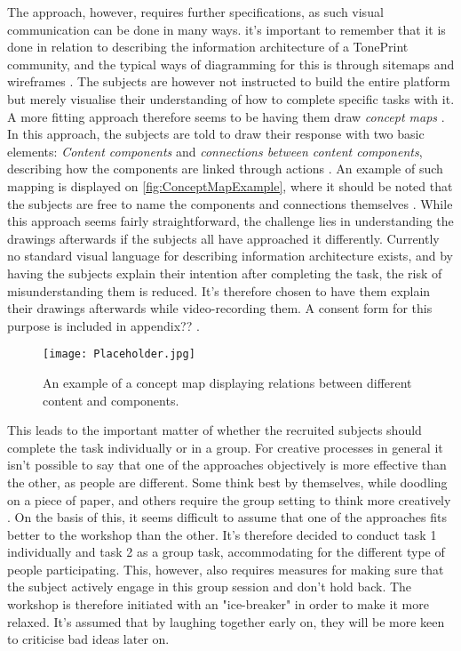The approach, however, requires further specifications, as such visual communication can be done in many ways. it's important to remember that it is done in relation to describing the information architecture of a TonePrint community, and the typical ways of diagramming for this is through sitemaps and wireframes \parencite[][392]{PDF:InformationArchitecture}. The subjects are however not instructed to build the entire platform but merely visualise their understanding of how to complete specific tasks with it. A more fitting approach therefore seems to be having them draw \textit{concept maps} \parencite[][113]{WEB:ConceptMapAnalysis}. In this approach, the subjects are told to draw their response with two basic elements: \textit{Content components} and \textit{connections between content components}, describing how the components are linked through actions \parencite[][393]{PDF:InformationArchitecture}. An example of such mapping is displayed on \autoref{fig:ConceptMapExample}, where it should be noted that the subjects are free to name the components and connections themselves . While this approach seems fairly straightforward, the challenge lies in understanding the drawings afterwards if the subjects all have approached it differently. Currently no standard visual language for describing information architecture exists, and by having the subjects explain their intention after completing the task, the risk of misunderstanding them is reduced. It's therefore chosen to have them explain their drawings afterwards while video-recording them. A consent form for this purpose is included in appendix?? .
%
\begin{figure}[H]
	\centering
	\texttt{[image: Placeholder.jpg]}
	\caption{An example of a concept map displaying relations between different content and components.}
	\label{fig:ConceptMapExample}
\end{figure}
%
\noindent
This leads to the important matter of whether the recruited subjects should complete the task individually or in a group. For creative processes in general it isn't possible to say that one of the approaches objectively is more effective than the other, as people are different. Some think best by themselves, while doodling on a piece of paper, and others require the group setting to think more creatively \parencite[][362]{PDF:InformationArchitecture}. On the basis of this, it seems difficult to assume that one of the approaches fits better to the workshop than the other. It's therefore decided to conduct task 1 individually and task 2 as a group task, accommodating for the different type of people participating. This, however, also requires measures for making sure that the subject actively engage in this group session and don't hold back. The workshop is therefore initiated with an "ice-breaker" in order to make it more relaxed. It's assumed that by laughing together early on, they will be more keen to criticise bad ideas later on.

